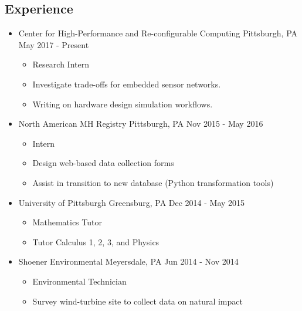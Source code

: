 \documentclass[18pt]{article}
\providecommand{\tightlist}{
    \setlength{\itemsep}{0pt}\setlength{\parskip}{0pt}
}
\begin{document}
    \subsection*{Experience}\label{experience}
      \begin{itemize}\tightlist
        
        \item Center for High-Performance and Re-configurable Computing \textbar{} Pittsburgh, PA \textbar{} May 2017 - Present
        \begin{itemize}\tightlist
          \item Research Intern
          \item Investigate trade-offs for embedded sensor networks.
          \item Writing on hardware design simulation workflows.
      	\end{itemize}
        
        \item North American MH Registry \textbar{} Pittsburgh, PA \textbar{} Nov 2015 - May 2016
        \begin{itemize}\tightlist
          \item Intern
          \item Design web-based data collection forms
          \item Assist in transition to new database (Python transformation tools)
        \end{itemize}

        \item University of Pittsburgh \textbar{} Greensburg, PA \textbar{} Dec 2014 - May 2015
        \begin{itemize}\tightlist
          \item Mathematics Tutor
          \item Tutor Calculus 1, 2, 3, and Physics
        \end{itemize}
        
        \item Shoener Environmental \textbar{} Meyersdale, PA \textbar{} Jun 2014 - Nov 2014
        \begin{itemize}\tightlist
          \item Environmental Technician
          \item Survey wind-turbine site to collect data on natural impact
        \end{itemize}

      \end{itemize} %
\end{document}
